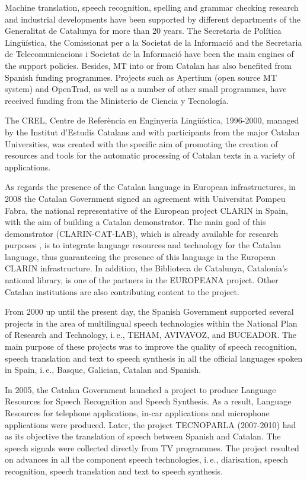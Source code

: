 \begin{multicols}{2}
Machine translation, speech recognition, spelling and grammar checking research and industrial developments have been supported by different departments of the Generalitat de Catalunya for more than 20 years. The Secretaria de Política Lingüística, the Comissionat per a la Societat de la Informació and the Secretaria de Telecomunicacions i Societat de la Informació have been the main engines of the support policies. Besides, MT into or from Catalan has also benefited from Spanish funding programmes. Projects such as Apertium (open source MT system) and OpenTrad, as well as a number of other small programmes, have received funding from the Ministerio de Ciencia y Tecnología. 


The CREL, Centre de Referència en Enginyeria Lingüística, 1996-2000, managed by the Institut d’Estudis Catalans and with participants from the major Catalan Universities, was created with the specific aim of promoting the creation of resources and tools for the automatic processing of Catalan texts in a variety of applications. 

As regards the presence of the Catalan language in European infrastructures, in 2008 the Catalan Government signed an agreement with Universitat Pompeu Fabra, the national representative of the European project CLARIN in Spain, with the aim of building a Catalan demonstrator. The main goal of this demonstrator (CLARIN-CAT-LAB), which is already available for research purposes \cite{CAT-Nota30}, is to integrate language resources and technology for the Catalan language, thus guaranteeing the presence of this language in the European CLARIN infrastructure. In addition, the Biblioteca de Catalunya, Catalonia’s national library, is one of the partners in the EUROPEANA project. Other Catalan institutions are also contributing content to the project.

From 2000 up until the present day, the Spanish Government supported several projects in the area of multilingual speech technologies within the National Plan of Research and Technology, i.\,e., TEHAM, AVIVAVOZ, and BUCEADOR. The main purpose of these projects was to improve the quality of speech recognition, speech translation and text to speech synthesis in all the official languages spoken in Spain, i.\,e., Basque, Galician, Catalan and Spanish.

In 2005, the Catalan Government launched a project to produce Language Resources for Speech Recognition and Speech Synthesis. As a result, Language Resources for telephone applications, in-car applications and microphone applications were produced. Later, the project TECNOPARLA (2007-2010) had as its objective the translation of speech between Spanish and Catalan. The speech signals were collected directly from TV programmes. The project resulted on advances in all the component speech technologies, i.\,e., diarisation, speech recognition, speech translation and text to speech synthesis.
  

\end{multicols}
